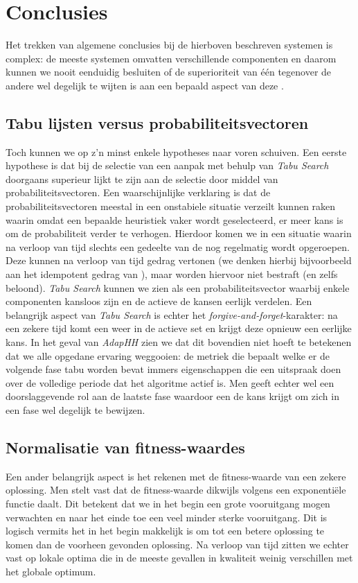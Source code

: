 \section{Conclusies}
Het trekken van algemene conclusies bij de hierboven beschreven systemen is complex: de meeste systemen omvatten verschillende componenten en daarom kunnen we nooit eenduidig besluiten of de superioriteit van \'e\'en \abhh{} tegenover de andere wel degelijk te wijten is aan een bepaald aspect van deze \abhh{}.

\subsection{Tabu lijsten versus probabiliteitsvectoren}
Toch kunnen we op z'n minst enkele hypotheses naar voren schuiven. Een eerste hypothese is dat bij de selectie van \abllhn{} een aanpak met behulp van \emph{Tabu Search} doorgaans superieur lijkt te zijn aan de selectie door middel van probabiliteitsvectoren. Een waarschijnlijke verklaring is dat de probabiliteitsvectoren meestal in een onstabiele situatie verzeilt kunnen raken waarin omdat een bepaalde heuristiek vaker wordt geselecteerd, er meer kans is om de probabiliteit verder te verhogen. Hierdoor komen we in een situatie waarin na verloop van tijd slechts een gedeelte van de \abllhn{} nog regelmatig wordt opgeroepen. Deze \abllhn{} kunnen na verloop van tijd \abieff{} gedrag vertonen (we denken hierbij bijvoorbeeld aan het idempotent gedrag van \abls{}), maar worden hiervoor niet bestraft (en zelfs beloond). \emph{Tabu Search} kunnen we zien als een probabiliteitsvector waarbij enkele componenten kansloos zijn en de actieve \abhn{} de kansen eerlijk verdelen. Een belangrijk aspect van \emph{Tabu Search} is echter het \emph{forgive-and-forget}-karakter: na een zekere tijd komt een \abh{} weer in de actieve set en krijgt deze opnieuw een eerlijke kans. In het geval van \emph{AdapHH} zien we dat dit bovendien niet hoeft te betekenen dat we alle opgedane ervaring weggooien: de metriek die bepaalt welke \abhn{} er de volgende fase tabu worden bevat immers eigenschappen die een uitspraak doen over de volledige periode dat het algoritme actief is. Men geeft echter wel een doorslaggevende rol aan de laatste fase waardoor een \abh{} de kans krijgt om zich in een fase wel degelijk te bewijzen.

\subsection{Normalisatie van fitness-waardes}
Een ander belangrijk aspect is het rekenen met de fitness-waarde van een zekere oplossing. Men stelt vast dat de fitness-waarde dikwijls volgens een exponenti\"ele functie daalt. Dit betekent dat we in het begin een grote vooruitgang mogen verwachten en naar het einde toe een veel minder sterke vooruitgang. Dit is logisch vermits het in het begin makkelijk is om tot een betere oplossing te komen dan de voorheen gevonden oplossing. Na verloop van tijd zitten we echter vast op lokale optima die in de meeste gevallen in kwaliteit weinig verschillen met het globale optimum.
